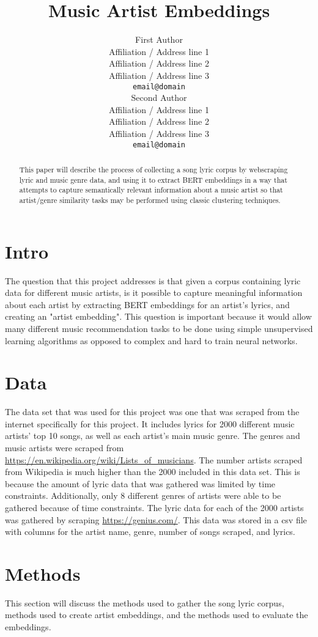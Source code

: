 \documentclass[11pt,a4paper]{article}
\title{Music Artist Embeddings}
\author{First Author \\
  Affiliation / Address line 1 \\
  Affiliation / Address line 2 \\
  Affiliation / Address line 3 \\
  \texttt{email@domain} \\\And
  Second Author \\
  Affiliation / Address line 1 \\
  Affiliation / Address line 2 \\
  Affiliation / Address line 3 \\
  \texttt{email@domain} \\}
\date{}
\begin{document}
\maketitle
\begin{abstract}
This paper will describe the process of collecting a song lyric corpus by webscraping lyric and music genre data, and using it to extract BERT embeddings in a way that attempts to capture semantically relevant information about a music artist so that artist/genre similarity tasks may be performed using classic clustering techniques.
\end{abstract}

\section{Intro}

The question that this project addresses is that given a corpus containing lyric data for different music artists, is it possible to capture meaningful information about each artist by extracting BERT embeddings for an artist's lyrics, and creating an "artist embedding". This question is important because it would allow many different music recommendation tasks to be done using simple unsupervised learning algorithms as opposed to complex and hard to train neural networks.

\section{Data}

The data set that was used for this project was one that was scraped from the internet specifically for this project. It includes lyrics for 2000 different music artists' top 10 songs, as well as each artist's main music genre. The genres and music artists were scraped from \href{https://en.wikipedia.org/wiki/Lists\_of\_musicians}{https://en.wikipedia.org/wiki/Lists\_of\_musicians}. The number artists scraped from Wikipedia is much higher than the 2000 included in this data set. This is because the amount of lyric data that was gathered was limited by time constraints. Additionally, only 8 different genres of artists were able to be gathered because of time constraints. The lyric data for each of the 2000 artists was gathered by scraping \href{https://genius.com/}{https://genius.com/}. This data was stored in a csv file with columns for the artist name, genre, number of songs scraped, and lyrics.

\section{Methods}
 This section will discuss the methods used to gather the song lyric corpus, methods used to create artist embeddings, and the methods used to evaluate the embeddings.
\end{document}
